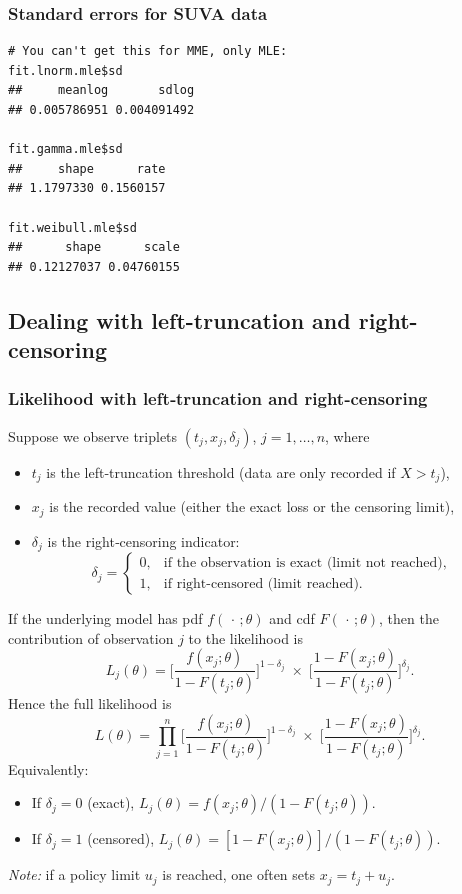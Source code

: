\documentclass[11pt]{article}
\begin{document}
\subsubsection{Standard errors for SUVA data}
\begin{lstlisting}
# You can't get this for MME, only MLE:
fit.lnorm.mle$sd
##     meanlog       sdlog
## 0.005786951 0.004091492

fit.gamma.mle$sd
##     shape      rate
## 1.1797330 0.1560157

fit.weibull.mle$sd
##      shape      scale
## 0.12127037 0.04760155
\end{lstlisting}

\subsection{Dealing with left-truncation and right-censoring}
\subsubsection{Likelihood with left‐truncation and right‐censoring}

\noindent Suppose we observe triplets \((t_j,x_j,\delta_j)\), \(j=1,\dots,n\), where
\begin{itemize}
  \item \(t_j\) is the left‐truncation threshold (data are only recorded if \(X>t_j\)),
  \item \(x_j\) is the recorded value (either the exact loss or the censoring limit),
  \item \(\delta_j\) is the right‐censoring indicator:
    \[
      \delta_j=\begin{cases}
        0,&\text{if the observation is exact (limit not reached),}\\
        1,&\text{if right‐censored (limit reached).}
      \end{cases}
    \]
\end{itemize}
\noindent If the underlying model has pdf \(f(\,\cdot\,;\theta)\) and cdf \(F(\,\cdot\,;\theta)\), then the contribution of observation \(j\) to the likelihood is
\[
L_j(\theta)
=\biggl[\frac{f(x_j;\theta)}{1 - F(t_j;\theta)}\biggr]^{1-\delta_j}
\;\times\;
\biggl[\frac{1 - F(x_j;\theta)}{1 - F(t_j;\theta)}\biggr]^{\delta_j}.
\]
Hence the full likelihood is
\[
L(\theta)
=\prod_{j=1}^n
\biggl[\frac{f(x_j;\theta)}{1 - F(t_j;\theta)}\biggr]^{1-\delta_j}
\;\times\;
\biggl[\frac{1 - F(x_j;\theta)}{1 - F(t_j;\theta)}\biggr]^{\delta_j}.
\]
\noindent Equivalently:
\begin{itemize}
  \item If \(\delta_j=0\) (exact), \(L_j(\theta)=f(x_j;\theta)/(1-F(t_j;\theta))\).
  \item If \(\delta_j=1\) (censored), \(L_j(\theta)=[1-F(x_j;\theta)]/(1-F(t_j;\theta))\).
\end{itemize}
\noindent\emph{Note:} if a policy limit \(u_j\) is reached, one often sets \(x_j=t_j+u_j\).
\end{document}
